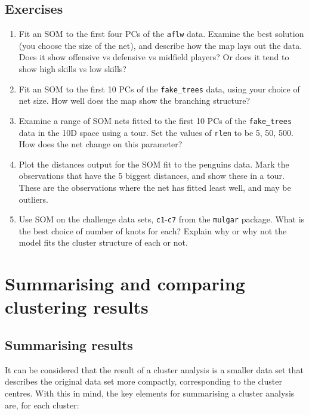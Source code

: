 \documentclass[
  letterpaper,
]{krantz}
\providecommand{\tightlist}{%
  \setlength{\itemsep}{0pt}\setlength{\parskip}{0pt}}
\begin{document}
\section*{Exercises}\label{exercises-10}


\begin{enumerate}
\def\labelenumi{\arabic{enumi}.}
\tightlist
\item
  Fit an SOM to the first four PCs of the \texttt{aflw} data. Examine
  the best solution (you choose the size of the net), and describe how
  the map lays out the data. Does it show offensive vs defensive vs
  midfield players? Or does it tend to show high skills vs low skills?
\item
  Fit an SOM to the first 10 PCs of the \texttt{fake\_trees} data, using
  your choice of net size. How well does the map show the branching
  structure?
\item
  Examine a range of SOM nets fitted to the first 10 PCs of the
  \texttt{fake\_trees} data in the 10D space using a tour. Set the
  values of \texttt{rlen} to be 5, 50, 500. How does the net change on
  this parameter?
\item
  Plot the distances output for the SOM fit to the penguins data. Mark
  the observations that have the 5 biggest distances, and show these in
  a tour. These are the observations where the net has fitted least
  well, and may be outliers.
\item
  Use SOM on the challenge data sets, \texttt{c1}-\texttt{c7} from the
  \texttt{mulgar} package. What is the best choice of number of knots
  for each? Explain why or why not the model fits the cluster structure
  of each or not.
\end{enumerate}

\chapter{Summarising and comparing clustering
results}\label{sec-clust-compare}

\section{Summarising results}\label{summarising-results}

It can be considered that the result of a cluster analysis is a smaller
data set that describes the original data set more compactly,
corresponding to the cluster centres. With this in mind, the key
elements for summarising a cluster analysis are, for each cluster:
\end{document}
